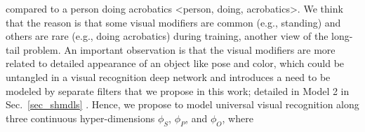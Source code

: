 \documentclass[runningheads]{llncs}
\begin{document}
compared to a person doing acrobatics \textless person, doing, acrobatics\textgreater. We think that the reason is that   some visual modifiers are  common (e.g., standing) and others are rare (e.g., doing acrobatics) during training, another view of the long-tail problem. An important observation is that the visual modifiers are more related to detailed appearance of an object like pose and color, which could be untangled in a visual recognition deep network and introduces a  need to be modeled by separate filters that we propose in this work; detailed in Model 2 in Sec.~\ref{sec_shmdls} . Hence, we propose to model universal visual  recognition along three continuous hyper-dimensions $\phi_S$, $\phi_P$, and $\phi_O$, where %
\end{document}
